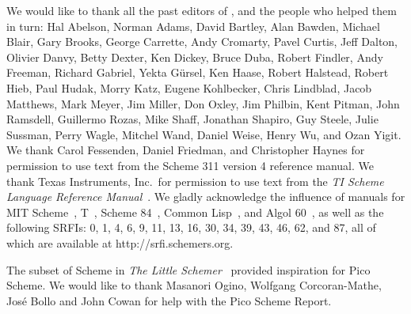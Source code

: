 We would like to thank all the past editors of \rsevenrs\cite{R7RS}, and the
people who helped them in turn: Hal Abelson, Norman Adams, David
Bartley, Alan Bawden, Michael Blair, Gary Brooks, George Carrette,
Andy Cromarty, Pavel Curtis, Jeff Dalton, Olivier Danvy, Betty Dexter,
Ken Dickey,
Bruce Duba, Robert Findler, Andy Freeman, Richard Gabriel, Yekta
G\"ursel, Ken Haase, Robert Halstead, Robert Hieb, Paul Hudak, Morry
Katz, Eugene Kohlbecker, Chris Lindblad, Jacob Matthews, Mark Meyer,
Jim Miller, Don Oxley, Jim Philbin, Kent Pitman, John Ramsdell,
Guillermo Rozas, Mike Shaff, Jonathan Shapiro, Guy Steele, Julie
Sussman, Perry Wagle, Mitchel Wand, Daniel Weise, Henry Wu, and Ozan
Yigit.  We thank Carol Fessenden, Daniel Friedman, and Christopher
Haynes for permission to use text from the Scheme 311 version 4
reference manual.  We thank Texas Instruments, Inc.~for permission to
use text from the {\em TI Scheme Language Reference
Manual}~\cite{TImanual85}.  We gladly acknowledge the influence of
manuals for MIT Scheme~\cite{MITScheme}, T~\cite{Rees84}, Scheme
84~\cite{Scheme84}, Common Lisp~\cite{CLtL}, and Algol 60~\cite{Naur63},
as well as the following SRFIs:  0, 1, 4, 6, 9, 11, 13, 16, 30, 34, 39, 43, 46, 62, and 87,
all of which are available at {\cf http://srfi.schemers.org}.



The subset of Scheme in
{\em The Little Schemer}~\cite{LittleSchemer} provided inspiration for
Pico Scheme. We would like to thank Masanori Ogino, Wolfgang Corcoran-Mathe, José Bollo and John Cowan
for help with the Pico Scheme Report.


